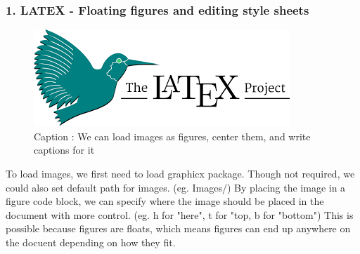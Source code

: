 \documentclass[a4paper, 11pt]{report}
\begin{document}
\subsubsection{1. LATEX - Floating figures and editing style sheets}
\begin{figure}[htp]
\centerline{\includegraphics{latexLogo.png}}
\caption{Caption : We can load images as figures, center them, and write captions for it}
\label{fig}
\end{figure}
To load images, we first need to load graphicx package. Though not required, we could also set default path for images. (eg. Images/) By placing the image in a figure code block, we can specify where the image should be placed in the document with more control. (eg. h for "here", t for "top, b for "bottom") This is possible because figures are floats, which means figures can end up anywhere on the docuent depending on how they fit. 
\end{document}
